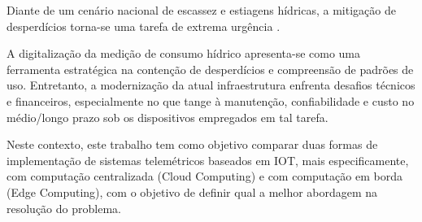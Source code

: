
Diante de um cenário nacional de escassez e estiagens hídricas, a mitigação de desperdícios torna-se uma tarefa de extrema urgência \cite{tratabrasil2025}.

A digitalização da medição de consumo hídrico apresenta-se como uma ferramenta estratégica na contenção de desperdícios e compreensão de padrões de uso. 
Entretanto, a modernização da atual infraestrutura enfrenta desafios técnicos e financeiros, especialmente no que tange à manutenção, confiabilidade e custo no médio/longo prazo sob os dispositivos empregados em tal tarefa.

Neste contexto, este trabalho tem como objetivo comparar duas formas de implementação de sistemas telemétricos baseados em IOT, mais especificamente, com computação centralizada (Cloud Computing) e com computação em borda (Edge Computing), com o objetivo de definir qual a melhor abordagem na resolução do problema.